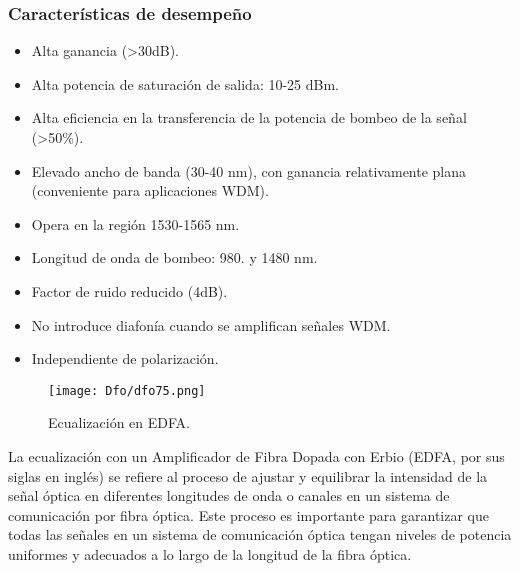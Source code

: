 \documentclass[
	12pt, %
	fleqn, %
	a4paper, %
	oneside, %
]{LegrandOrangeBook}
\begin{document}
\subsubsection{Características de desempeño}
\begin{itemize}
\item Alta ganancia (>30dB).
\item Alta potencia de saturación de salida: 10-25 dBm.
\item Alta eficiencia en la transferencia de la potencia de bombeo de la señal (>50\%).
\item Elevado ancho de banda (30-40 nm), con ganancia relativamente plana (conveniente para aplicaciones WDM).
\item Opera en la región 1530-1565 nm.
\item Longitud de onda de bombeo: 980. y 1480 nm.
\item Factor de ruido reducido (4dB).
\item No introduce diafonía cuando se amplifican señales WDM.
\item Independiente de polarización.
\end{itemize}

\begin{figure}[H]
\centering
\texttt{[image: Dfo/dfo75.png]}
\caption{Ecualización en EDFA.}
\end{figure}
\begin{notation}
La ecualización con un Amplificador de Fibra Dopada con Erbio (EDFA, por sus siglas en inglés) se refiere al proceso de ajustar y equilibrar la intensidad de la señal óptica en diferentes longitudes de onda o canales en un sistema de comunicación por fibra óptica. Este proceso es importante para garantizar que todas las señales en un sistema de comunicación óptica tengan niveles de potencia uniformes y adecuados a lo largo de la longitud de la fibra óptica.
\end{notation}
\end{document}
